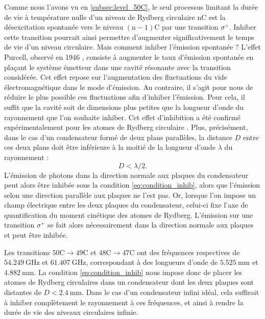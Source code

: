 Comme nous l'avons vu en \ref{subsec:level_50C}, le seul processus limitant la durée de vie à température nulle d'un niveau de Rydberg circulaire $\mathrm{nC}$ est la désexcitation spontanée vers le niveau $\mathrm{(n-1)C}$ par une transition $\sigma^+$.
Inhiber cette transition pourrait ainsi permettre d'augmenter significativement le temps de vie d'un niveau circulaire.
Mais comment inhiber l'émission spontanée ?
L'effet Purcell, observé en 1946 \cite{Purcell46_Purcelleffect}, consiste à augmenter le taux d'émission spontanée en plaçant le système émetteur dans une cavité résonante avec la transition considérée.
Cet effet repose sur l'augmentation des fluctuations du vide électromagnétique dans le mode d'émission.
Au contraire, il s'agit pour nous de réduire le plus possible ces fluctuations afin d'inhiber l'émission.
Pour cela, il suffit que la cavité soit de dimensions plus petites que la longueur d'onde du rayonnement que l'on souhaite inhiber.
Cet effet d'inhibition a été confirmé expérimentalement pour les atomes de Rydberg circulaire \cite{MX_KELPPNER_INHIBITION,MX_KLEPPNERINHIBITION85}.
Plus, précisément, dans le cas d'un condensateur formé de deux plans parallèles, la distance $D$ entre ces deux plans doit être inférieure à la moitié de la longueur d'onde $\lambda$ du rayonnement :
%
\begin{equation}
\label{eq:condition_inhib}
D< \lambda/2.
\end{equation}
%
L'émission de photons dans la direction normale aux plaques du condensateur peut alors être inhibée sous la condition \eqref{eq:condition_inhib}, alors que l'émission selon une direction parallèle aux plaques ne l'est pas.
Or, lorsque l'on impose un champ électrique entre les deux plaques du condensateur, celui-ci fixe l'axe de quantification du moment cinétique des atomes de Rydberg.
L'émission sur une transition $\sigma^+$ se fait alors nécessairement dans la direction normale aux plaques et peut être inhibée.

Les transitions $\mathrm{50C}\!\rightarrow \!\mathrm{49C}$ et $\mathrm{48C}\!\rightarrow\! \mathrm{47C}$ ont des fréquences respectives de $\SI{54.249}{\GHz}$ et $\SI{61.407}{\GHz}$, correspondant à des longueurs d'onde de $\SI{5.525}{\mm}$ et $\SI{4.882}{\mm}$.
La condition \eqref{eq:condition_inhib} nous impose donc de placer les atomes de Rydberg circulaires dans un condensateur dont les deux plaques sont distantes de $D<\SI{2.4}{\mm}$.
Dans le cas d'un condensateur infini idéal, cela suffirait à inhiber complètement le rayonnement à ces fréquences, et ainsi à rendre la durée de vie des niveaux circulaires infinie.

